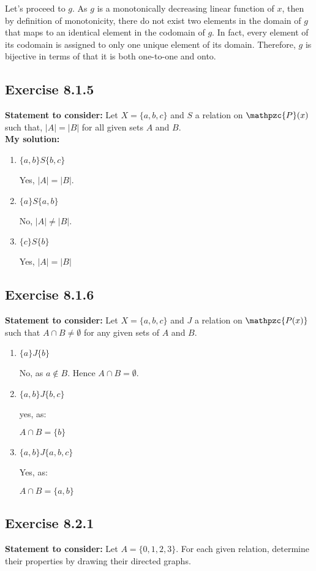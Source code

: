 \documentclass{report}
\newcommand{\cent}[1]{\begin{center}#1\end{center}}
\newcommand{\script}[1]{\mathpzc{#1}}
\newcommand{\assignmentDescription}{\textbf{Statement to consider: }}
\newcommand{\solution}{\textbf{My solution: }}
\newcommand{\Exercise}[1]{\subsection{Exercise #1}}
\newcommand{\defaultEnumerateLabel}{\textbf{\alph*.}}
\begin{document}
 	Let's proceed to $g$. As $g$ is a monotonically  decreasing linear function of $x$, then by definition of monotonicity, there do not exist two elements in the domain of $g$ that maps to an identical element in the codomain of $g$. In fact, every element of its codomain is assigned to only one unique element of its domain. Therefore, $g$ is bijective in terms of that it is both one-to-one and onto.
 	
 	\Exercise{8.1.5}
 	
 	\assignmentDescription
 	Let $X=\{a,b,c\}$ and $S$ a relation on $\script{P}(x)$ such that,  $|A|=|B|$ for all given sets $A$ and $B$.\\
 	
 	\solution
 	\begin{enumerate}[label=\defaultEnumerateLabel]
 		\item $\{a,b\} S \{b,c\}$
 		
 		Yes, $|A| = |B|$.
 		
 		\item $\{a\} S \{a,b\}$
 		
 		No, $|A| \neq |B| $.
 		
 		\item $\{c\} S \{b\}$
 		
 		Yes, $|A| = |B|$
 	\end{enumerate}
 	
 	\Exercise{8.1.6}
 	
 	\assignmentDescription
 	Let $X=\{a,b,c\}$ and $J$ a relation on $\script{P(x)}$ such that $A\cap B \neq \emptyset$ for any given sets of $A$ and $B$.
 	
 	\begin{enumerate}[label = \defaultEnumerateLabel]
 		\item $\{a\} J \{b\}$
 		
 		No, as $a \notin B$. Hence $A \cap B = \emptyset$. 
 		
 		\item $\{a,b\} J \{b,c\}$
 		
 		yes, as:
 		
 		\cent{$A \cap B = \{b\}$}
 		
 		\item $\{a,b\} J \{a,b,c\}$
 		
 		Yes, as:
 		
 		\cent{$A \cap B = \{a,b\}$}
 	\end{enumerate}
 	
 	\Exercise{8.2.1}
 	
 	\assignmentDescription
 	Let $A=\{0,1,2,3\}$. For each given relation, determine their properties by drawing their directed graphs.\\
 	
\end{document}
